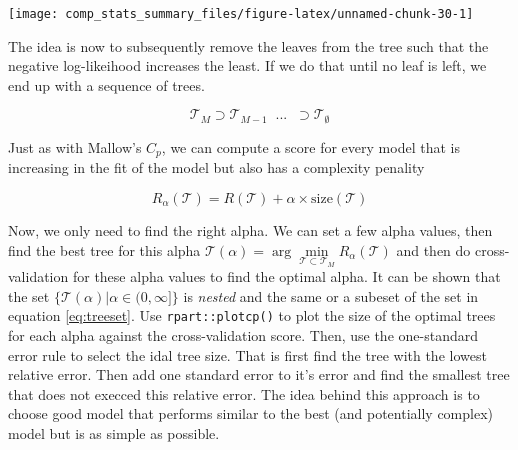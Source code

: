 \documentclass[]{book}
\newenvironment{Shaded}{\begin{snugshade}}{\end{snugshade}}
\newcommand{\KeywordTok}[1]{\textcolor[rgb]{0.13,0.29,0.53}{\textbf{{#1}}}}
\newcommand{\DataTypeTok}[1]{\textcolor[rgb]{0.13,0.29,0.53}{{#1}}}
\newcommand{\DecValTok}[1]{\textcolor[rgb]{0.00,0.00,0.81}{{#1}}}
\newcommand{\FloatTok}[1]{\textcolor[rgb]{0.00,0.00,0.81}{{#1}}}
\newcommand{\StringTok}[1]{\textcolor[rgb]{0.31,0.60,0.02}{{#1}}}
\newcommand{\CommentTok}[1]{\textcolor[rgb]{0.56,0.35,0.01}{\textit{{#1}}}}
\newcommand{\NormalTok}[1]{{#1}}
\begin{document}
\begin{Shaded}
\end{Shaded}

\texttt{[image: comp\_stats\_summary\_files/figure-latex/unnamed-chunk-30-1]}

The idea is now to subsequently remove the leaves from the tree such
that the negative log-likeihood increases the least. If we do that until
no leaf is left, we end up with a sequence of trees.

\begin{equation}
\mathcal{T}_M \supset \mathcal{T}_{M-1} \;\;...\;\;\supset \mathcal{T}_{\emptyset}
\label{eq:treeset}
\end{equation}

Just as with Mallow's \(C_p\), we can compute a score for every model
that is increasing in the fit of the model but also has a complexity
penality

\[R_{\alpha}(\mathcal{T}) = R(\mathcal{T}) + \alpha \times \text{size}(\mathcal{T})\]

Now, we only need to find the right alpha. We can set a few alpha
values, then find the best tree for this alpha
\(\mathcal{T}(\alpha) = \arg\min\limits_{\mathcal{T} \subset \mathcal{T}_M}R_{\alpha}(\mathcal{T})\)
and then do cross-validation for these alpha values to find the optimal
alpha. It can be shown that the set
\(\{\mathcal{T}(\alpha)| \alpha \in (0, \infty]\}\) is \emph{nested} and
the same or a subeset of the set in equation \eqref{eq:treeset}. Use
\texttt{rpart::plotcp()} to plot the size of the optimal trees for each
alpha against the cross-validation score. Then, use the one-standard
error rule to select the idal tree size. That is first find the tree
with the lowest relative error. Then add one standard error to it's
error and find the smallest tree that does not execced this relative
error. The idea behind this approach is to choose good model that
performs similar to the best (and potentially complex) model but is as
simple as possible.
\end{document}
